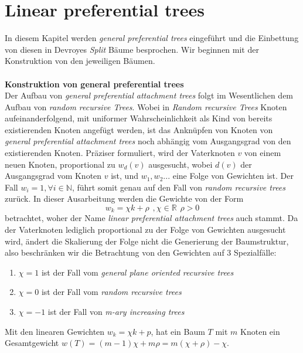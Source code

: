 \chapter{Linear preferential trees} 
In diesem Kapitel werden \textit{general preferential trees} eingeführt und die Einbettung von diesen in Devroyes \textit{Split} Bäume besprochen. Wir beginnen mit der Konstruktion von den jeweiligen Bäumen.
\\
\\
\textbf{\fontsize{14}{18}\selectfont Konstruktion von general preferential trees}\\
Der Aufbau von \textit{general preferential attachment trees} folgt im Wesentlichen dem Aufbau von \textit{random recursive Trees}. Wobei in \textit{Random recursive Trees} Knoten aufeinanderfolgend, mit uniformer Wahrscheinlichkeit als Kind von bereits existierenden Knoten angefügt werden, ist das Anknüpfen von Knoten von \textit{general preferential attachment trees} noch abhängig vom Ausgangsgrad von den existierenden Knoten. Präziser formuliert, wird der Vaterknoten $v$ von einem neuen Knoten, proportional zu $w_d(v)$ ausgesucht, wobei $d(v)$ der Ausgangsgrad vom Knoten $v$ ist, und $w_1, w_2...$ eine Folge von Gewichten ist. Der Fall $w_i = 1, \forall i \in \mathbb{N}$, führt somit genau auf den Fall von \textit{random recursive trees} zurück. In dieser Ausarbeitung werden die Gewichte von der Form 
\[
w_k = \chi k + \rho \hspace{5pt}, \chi \in \mathbb{R}\hspace{5pt} \rho > 0
\]
betrachtet, woher der Name \textit{linear preferential attachment trees} auch stammt. Da der Vaterknoten lediglich proportional zu der Folge von Gewichten ausgesucht wird, ändert die Skalierung der Folge nicht die Generierung der Baumstruktur, also beschränken wir die Betrachtung von den Gewichten auf 3 Spezialfälle:
\begin{enumerate}
    \item $\chi = 1$ ist der Fall vom \textit{general plane oriented recursive trees} \cite{panholzer2007level} 
    \item $\chi = 0$ ist der Fall vom \textit{random recursive trees}
    \item $\chi = -1$ ist der Fall von \textit{m-ary increasing trees}
\end{enumerate}
\begin{theorem}
\cite[Lemma 3.1]{janson2019random}
   Mit den linearen Gewichten $w_k = \chi k + p $, hat ein Baum $T$ mit $m$ Knoten ein Gesamtgewicht $w(T) = (m-1)\chi + m\rho = m(\chi + \rho) - \chi$.
\end{theorem}
